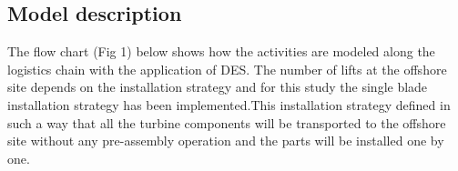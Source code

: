 \subsection{Model description}
The flow chart (Fig 1) below shows  how the activities are modeled along the logistics chain with the application of DES.  The number of lifts at the offshore site depends on the installation strategy and for this study the single blade installation strategy has been implemented.This installation strategy defined in such a way that all the turbine components will be transported to the offshore site without any pre-assembly operation and the parts will be installed one by one.  
